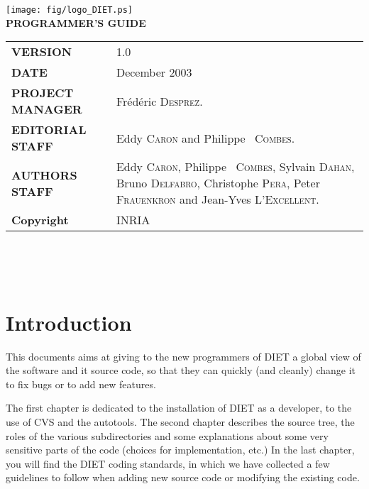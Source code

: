 \documentclass[11pt,a4paper]{report}
\begin{document}

\thispagestyle{empty}
\vspace*{3cm}
\vspace*{3cm}

\begin{center}
\texttt{[image: fig/logo\_DIET.ps]}\\[2ex]
\textbf{\Huge PROGRAMMER'S GUIDE\\[2ex]}
\end{center}

\vfill


\noindent
\small{
\begin{tabular}{ll}
  \textbf{VERSION}  & 1.0\\
  \textbf{DATE}     & December 2003\\
  \textbf{PROJECT MANAGER}  & Fr\'ed\'eric \textsc{Desprez}.\\
  \textbf{EDITORIAL STAFF}  & Eddy \textsc{Caron} and Philippe ~\textsc{Combes}.\\
  \textbf{AUTHORS STAFF}    & 
\begin{minipage}[t]{12cm}
  Eddy \textsc{Caron}, Philippe ~\textsc{Combes}, Sylvain \textsc{Dahan}, Bruno \textsc{Delfabro}, Christophe \textsc{Pera}, Peter \textsc{Frauenkron} and Jean-Yves \textsc{L'Excellent}.
\end{minipage} \\
  \textbf{Copyright}& INRIA
\end{tabular}\\
}

\newpage
\thispagestyle{empty}
\ 


\newpage
\tableofcontents


\sloppy

%
%
\newpage
{}
\chapter*{Introduction}

This documents aims at giving to the new programmers of DIET a global view of the
software and it source code, so that they can quickly (and cleanly) change it to
fix bugs or to add new features.

The first chapter is dedicated to the installation of DIET as a developer, to
the use of CVS and the autotools.
The second chapter describes the source tree, the roles of the various
subdirectories and some explanations about some very sensitive parts of the code
(choices for implementation, etc.)
In the last chapter, you will find the DIET coding standards, in which we have
collected a few guidelines to follow when adding new source code or modifying
the existing code.
\end{document}
